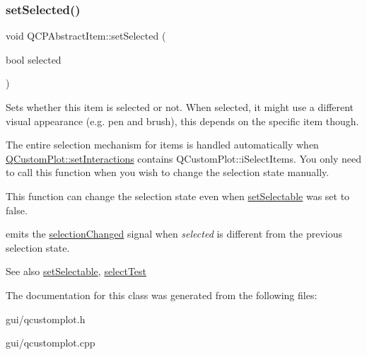 \subsubsection{\texorpdfstring{set\+Selected()}{setSelected()}}
{\footnotesize\ttfamily void Q\+C\+P\+Abstract\+Item\+::set\+Selected (\begin{DoxyParamCaption}\item[{bool}]{selected }\end{DoxyParamCaption})}

Sets whether this item is selected or not. When selected, it might use a different visual appearance (e.\+g. pen and brush), this depends on the specific item though.

The entire selection mechanism for items is handled automatically when \hyperlink{classQCustomPlot_a5ee1e2f6ae27419deca53e75907c27e5}{Q\+Custom\+Plot\+::set\+Interactions} contains Q\+Custom\+Plot\+::i\+Select\+Items. You only need to call this function when you wish to change the selection state manually.

This function can change the selection state even when \hyperlink{classQCPAbstractItem_a8a8e32a55bc478b849756a78c2d87fd2}{set\+Selectable} was set to false.

emits the \hyperlink{classQCPAbstractItem_aa5cffb034fc65dbb91c77e02c1c14251}{selection\+Changed} signal when {\itshape selected} is different from the previous selection state.

\begin{DoxySeeAlso}{See also}
\hyperlink{classQCPAbstractItem_a8a8e32a55bc478b849756a78c2d87fd2}{set\+Selectable}, \hyperlink{classQCPAbstractItem_ae41d0349d68bb802c49104afd100ba2a}{select\+Test} 
\end{DoxySeeAlso}


The documentation for this class was generated from the following files\+:\begin{DoxyCompactItemize}
\item 
gui/qcustomplot.\+h\item 
gui/qcustomplot.\+cpp\end{DoxyCompactItemize}
